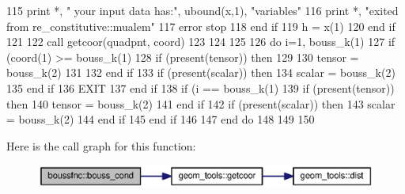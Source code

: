 \begin{DoxyCode}
115             print *, \textcolor{stringliteral}{"       your input data has:"}, ubound(x,1), \textcolor{stringliteral}{"variables"}
116             print *, \textcolor{stringliteral}{"exited from re\_constitutive::mualem"}
117             error stop
118 \textcolor{keywordflow}{          end if}
119           h = x(1)
120 \textcolor{keywordflow}{        end if}
121         
122         \textcolor{keyword}{call }getcoor(quadpnt, coord)
123         
124 
125         
126         \textcolor{keywordflow}{do} i=1, bouss_k(1)%
127           \textcolor{keywordflow}{if} (coord(1) >= bouss_k(1)%
128             \textcolor{keywordflow}{if} (\textcolor{keyword}{present}(tensor)) \textcolor{keywordflow}{then}
129 
130               tensor =  bouss_k(2)%
131 
132 \textcolor{keywordflow}{            end if}
133             \textcolor{keywordflow}{if} (\textcolor{keyword}{present}(scalar)) \textcolor{keywordflow}{then}
134               scalar =  bouss_k(2)%
135 \textcolor{keywordflow}{            end if}
136             \textcolor{keywordflow}{EXIT}
137 \textcolor{keywordflow}{          end if}
138           \textcolor{keywordflow}{if} (i == bouss_k(1)%
139             \textcolor{keywordflow}{if} (\textcolor{keyword}{present}(tensor)) \textcolor{keywordflow}{then}
140               tensor =  bouss_k(2)%
141 \textcolor{keywordflow}{            end if}
142             \textcolor{keywordflow}{if} (\textcolor{keyword}{present}(scalar)) \textcolor{keywordflow}{then}
143               scalar =  bouss_k(2)%
144 \textcolor{keywordflow}{            end if}
145 \textcolor{keywordflow}{          end if}
146           
147 \textcolor{keywordflow}{        end do}
148         
149         
150       
\end{DoxyCode}


Here is the call graph for this function\+:\nopagebreak
\begin{figure}[H]
\begin{center}
\leavevmode
\includegraphics[width=350pt]{namespaceboussfnc_a1eb4dcb6eb00362b392c983cf5cefb45_cgraph}
\end{center}
\end{figure}




